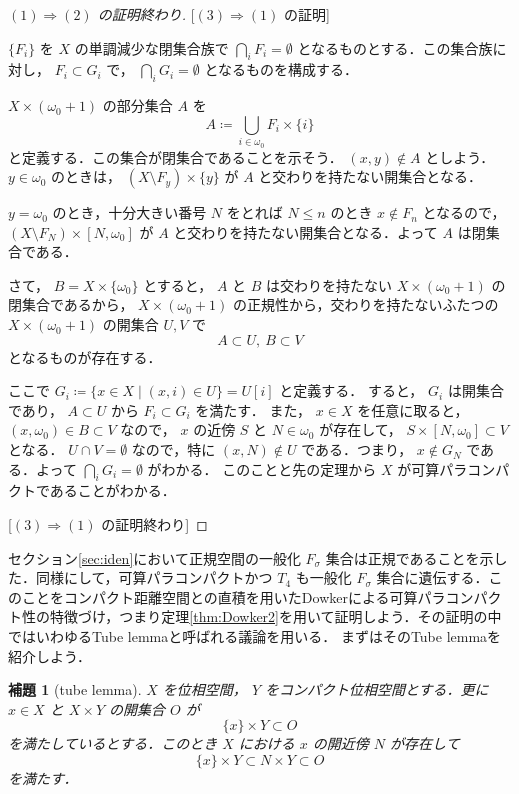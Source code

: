 \documentclass[leqno, 12pt]{ltjsarticle}
\newtheorem{lem}[thm]{補題}
\newcommand{\To}{\Longrightarrow}
\newcommand{\slice}[2]{#1[#2]}
\newcommand{\omegazero}{\omega_{0}}
\begin{document}
\begin{proof}
[$(1)\To (2)$
の証明終わり]

[$(3)\To (1)$
の証明]


$\{F_{i}\}$
を
$X$
の単調減少な閉集合族で
$\bigcap_{i}F_{i}=\emptyset$
となるものとする．この集合族に対し，
$F_{i}\subset G_{i}$
で，
$\bigcap_{i}G_{i}=\emptyset$
となるものを構成する．

$X\times (\omegazero+1)$
の部分集合
$A$
を
\[
A\coloneqq\bigcup_{i\in \omegazero}F_{i}\times \{i\}
\]
と定義する．この集合が閉集合であることを示そう．
$(x,y)\notin A$
としよう．
$y\in \omegazero$
のときは，
$(X\setminus F_{y})\times \{y\}$
が
$A$
と交わりを持たない開集合となる．

$y=\omegazero$
のとき，十分大きい番号
$N$
をとれば
$N\le n$
のとき
$x\notin F_{n}$
となるので，
$(X\setminus  F_{N})\times [N,\omegazero]$
が
$A$
と交わりを持たない開集合となる．よって
$A$
は閉集合である．

さて，
$B=X\times \{\omegazero\}$
とすると，
$A$
と
$B$
は交わりを持たない
$X\times (\omegazero+1)$
の閉集合であるから，
$X\times (\omegazero+1)$
の正規性から，交わりを持たないふたつの
$X\times (\omegazero+1)$
の開集合
$U,V$
で
\[
A\subset U,\ B\subset V
\]
となるものが存在する．

ここで
$G_{i}\coloneqq\{x\in X \mid (x, i)\in U\}=\slice{U}{i}$
と定義する．
すると，
$G_{i}$
は開集合であり，
$A\subset U$
から
$F_{i}\subset G_{i}$
を満たす．
また，
$x\in X$
を任意に取ると，
$(x, \omegazero)\in B\subset V$
なので，
$x$
の近傍
$S$
と
$N\in \omegazero$
が存在して，
$S\times [N, \omegazero]\subset V$
となる．
$U\cap V=\emptyset$
なので，特に
$(x, N)\notin U$
である．つまり，
$x\notin G_{N}$
である．よって
$\bigcap_{i}G_{i}=\emptyset$
がわかる．
このことと先の定理から
$X$
が可算パラコンパクトであることがわかる．

[$(3)\To (1)$
の証明終わり]
\end{proof}

セクション\ref{sec:iden}において正規空間の一般化
$F_{\sigma}$
集合は正規であることを示した．同様にして，可算パラコンパクトかつ
$T_{4}$
も一般化
$F_{\sigma}$
集合に遺伝する．このことをコンパクト距離空間との直積を用いたDowkerによる可算パラコンパクト性の特徴づけ，つまり定理\ref{thm:Dowker2}を用いて証明しよう．その証明の中ではいわゆるTube lemmaと呼ばれる議論を用いる．
まずはそのTube lemmaを紹介しよう．

\begin{lem}[tube lemma]\label{lem:tube}
$X$
を位相空間，
$Y$
をコンパクト位相空間とする．更に
$x\in X$
と
$X\times Y$
の開集合
$O$
が
\[
\{x\}\times Y\subset O
\]
を満たしているとする．このとき
$X$
における
$x$
の開近傍
$N$
が存在して
\[
\{x\}\times Y\subset N\times Y\subset O
\]
を満たす．
\end{lem}
\end{document}
